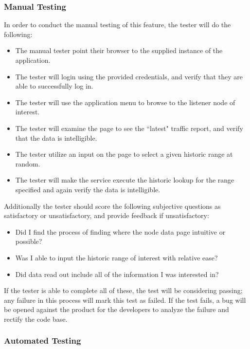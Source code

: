 \documentclass[]{article}
\begin{document}
	\subsubsection{Manual Testing}
	
	In order to conduct the manual testing of this feature, the tester will do the following:
	
	\begin{itemize}
	    \item The manual tester point their browser to the supplied instance of the application.
	    \item The tester will login using the provided credentials, and verify that they are able to successfully log in.
	    \item The tester will use the application menu to browse to the listener node of interest.
	    \item The tester will examine the page to see the ``latest" traffic report, and verify that the data is intelligible.
	    \item The tester utilize an input on the page to select a given historic range at random.
	    \item The tester will make the service execute the historic lookup for the range specified and again verify the data is intelligible.
	\end{itemize}
	
	Additionally the tester should score the following subjective questions as satisfactory or unsatisfactory,
	and provide feedback if unsatisfactory:
	
	\begin{itemize}
	   \item Did I find the process of finding where the node data page intuitive or possible? 
	   \item Was I able to input the historic range of interest with relative ease?
	   \item Did data read out include all of the information I was interested in?
	\end{itemize}

    If the tester is able to complete all of these, the test will be considering passing; any failure in this process will
    mark this test as failed. If the test fails, a bug will be opened against the product for the developers to analyze the
    failure and rectify the code base.
	
	\subsubsection{Automated Testing}
	
\end{document}
